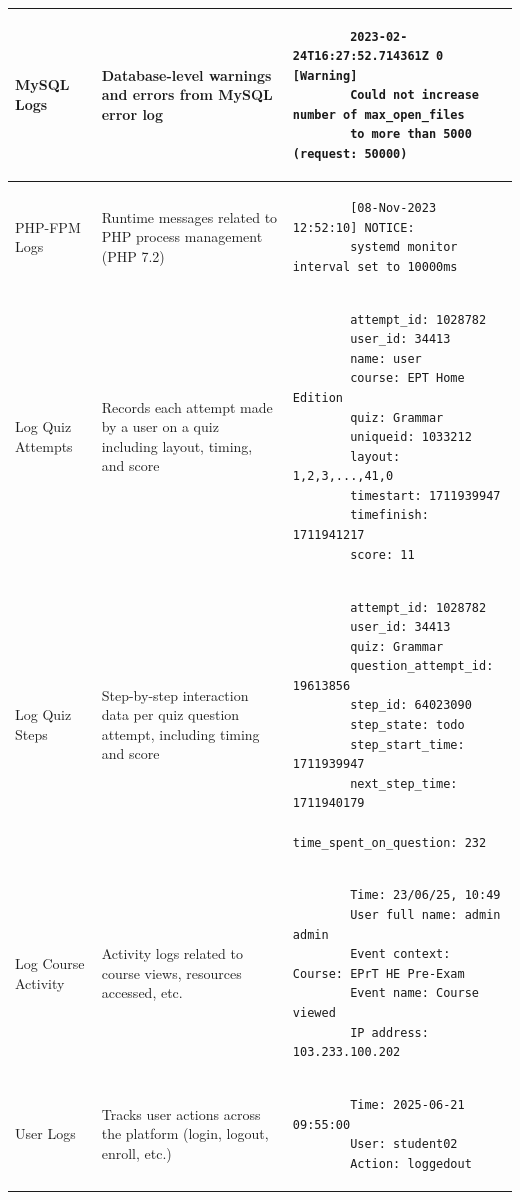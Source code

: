 \begin{longtable}{|p{3.5cm}|p{5cm}|p{7cm}|}
	MySQL Logs & Database-level warnings and errors from MySQL error log &
	\scriptsize\ttfamily
	\begin{lstlisting}
		2023-02-24T16:27:52.714361Z 0 [Warning] 
		Could not increase number of max_open_files 
		to more than 5000 (request: 50000)
	\end{lstlisting}
	\normalsize \\
	\hline
	
	PHP-FPM Logs & Runtime messages related to PHP process management (PHP 7.2) &
	\scriptsize\ttfamily
	\begin{lstlisting}
		[08-Nov-2023 12:52:10] NOTICE: 
		systemd monitor interval set to 10000ms
	\end{lstlisting}
	\normalsize \\
	\hline
	
	Log Quiz Attempts & Records each attempt made by a user on a quiz including layout, timing, and score &
	\scriptsize\ttfamily
	\begin{lstlisting}
		attempt_id: 1028782
		user_id: 34413
		name: user
		course: EPT Home Edition
		quiz: Grammar
		uniqueid: 1033212
		layout: 1,2,3,...,41,0
		timestart: 1711939947
		timefinish: 1711941217
		score: 11
	\end{lstlisting}
	\normalsize \\
	\hline
	
	Log Quiz Steps & Step-by-step interaction data per quiz question attempt, including timing and score &
	\scriptsize\ttfamily
	\begin{lstlisting}
		attempt_id: 1028782
		user_id: 34413
		quiz: Grammar
		question_attempt_id: 19613856
		step_id: 64023090
		step_state: todo
		step_start_time: 1711939947
		next_step_time: 1711940179
		time_spent_on_question: 232
	\end{lstlisting}
	\normalsize \\
	\hline
	
	Log Course Activity & Activity logs related to course views, resources accessed, etc. &
	\scriptsize\ttfamily
	\begin{lstlisting}
		Time: 23/06/25, 10:49
		User full name: admin admin
		Event context: Course: EPrT HE Pre-Exam
		Event name: Course viewed
		IP address: 103.233.100.202
	\end{lstlisting}
	\normalsize \\
	\hline
	
	User Logs & Tracks user actions across the platform (login, logout, enroll, etc.) &
	\scriptsize\ttfamily
	\begin{lstlisting}
		Time: 2025-06-21 09:55:00 
		User: student02 
		Action: loggedout
	\end{lstlisting}
	\normalsize \\
	\hline
	
\end{longtable}


